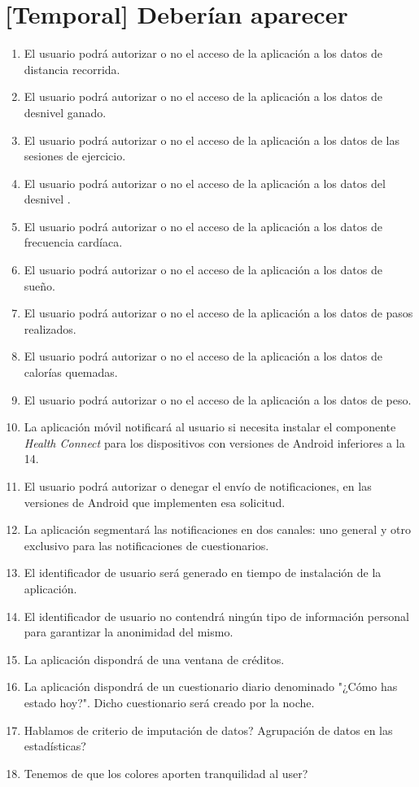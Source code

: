 \section{[Temporal] Deberían aparecer}
    \begin{enumerate}
        \item El usuario podrá autorizar o no el acceso de la aplicación a los datos de distancia recorrida.
        \item El usuario podrá autorizar o no el acceso de la aplicación a los datos de desnivel ganado.
        \item El usuario podrá autorizar o no el acceso de la aplicación a los datos de las sesiones de ejercicio.
        \item El usuario podrá autorizar o no el acceso de la aplicación a los datos del desnivel .
        \item El usuario podrá autorizar o no el acceso de la aplicación a los datos de frecuencia cardíaca.
        \item El usuario podrá autorizar o no el acceso de la aplicación a los datos de sueño.
        \item El usuario podrá autorizar o no el acceso de la aplicación a los datos de pasos realizados.
        \item El usuario podrá autorizar o no el acceso de la aplicación a los datos de calorías quemadas.
        \item El usuario podrá autorizar o no el acceso de la aplicación a los datos de peso.
        \item La aplicación móvil notificará al usuario si necesita instalar el componente \textit{Health Connect} para los dispositivos con versiones de Android inferiores a la 14.
        \item El usuario podrá autorizar o denegar el envío de notificaciones, en las versiones de Android que implementen esa solicitud.
        \item La aplicación segmentará las notificaciones en dos canales: uno general y otro exclusivo para las notificaciones de cuestionarios.
        \item El identificador de usuario será generado en tiempo de instalación de la aplicación.
        \item El identificador de usuario no contendrá ningún tipo de información personal para garantizar la anonimidad del mismo.        
        \item La aplicación dispondrá de una ventana de créditos.
        \item La aplicación dispondrá de un cuestionario diario denominado "¿Cómo has estado hoy?". Dicho cuestionario será creado por la noche.
        \item Hablamos de criterio de imputación de datos? Agrupación de datos en las estadísticas?
        \item Tenemos de que los colores aporten tranquilidad al user?
    \end{enumerate}
